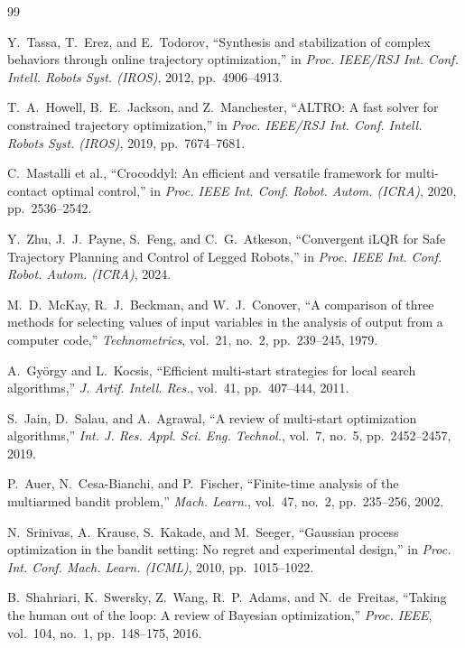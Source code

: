 \documentclass[lettersize,journal]{IEEEtran}
\begin{document}
\begin{thebibliography}{99}


Y.~Tassa, T.~Erez, and E.~Todorov, ``Synthesis and stabilization of complex behaviors through online trajectory optimization,''
in \textit{Proc. IEEE/RSJ Int. Conf. Intell. Robots Syst. (IROS)}, 2012, pp.~4906--4913.

T.~A.~Howell, B.~E.~Jackson, and Z.~Manchester, ``ALTRO: A fast solver for constrained trajectory optimization,''
in \textit{Proc. IEEE/RSJ Int. Conf. Intell. Robots Syst. (IROS)}, 2019, pp.~7674--7681.

C.~Mastalli et al., ``Crocoddyl: An efficient and versatile framework for multi-contact optimal control,''
in \textit{Proc. IEEE Int. Conf. Robot. Autom. (ICRA)}, 2020, pp.~2536--2542.

Y.~Zhu, J.~J.~Payne, S.~Feng, and C.~G.~Atkeson, ``Convergent iLQR for Safe Trajectory Planning and Control of Legged Robots,''
in \textit{Proc. IEEE Int. Conf. Robot. Autom. (ICRA)}, 2024.

M.~D.~McKay, R.~J.~Beckman, and W.~J.~Conover, ``A comparison of three methods for selecting values of input variables in the analysis of output from a computer code,''
\textit{Technometrics}, vol.~21, no.~2, pp.~239--245, 1979.

A.~Gy\"{o}rgy and L.~Kocsis, ``Efficient multi-start strategies for local search algorithms,''
\textit{J. Artif. Intell. Res.}, vol.~41, pp.~407--444, 2011.

S.~Jain, D.~Salau, and A.~Agrawal, ``A review of multi-start optimization algorithms,''
\textit{Int. J. Res. Appl. Sci. Eng. Technol.}, vol.~7, no.~5, pp.~2452--2457, 2019.

P.~Auer, N.~Cesa-Bianchi, and P.~Fischer, ``Finite-time analysis of the multiarmed bandit problem,''
\textit{Mach. Learn.}, vol.~47, no.~2, pp.~235--256, 2002.

N.~Srinivas, A.~Krause, S.~Kakade, and M.~Seeger, ``Gaussian process optimization in the bandit setting: No regret and experimental design,''
in \textit{Proc. Int. Conf. Mach. Learn. (ICML)}, 2010, pp.~1015--1022.

B.~Shahriari, K.~Swersky, Z.~Wang, R.~P.~Adams, and N.~de~Freitas, ``Taking the human out of the loop: A review of Bayesian optimization,''
\textit{Proc. IEEE}, vol.~104, no.~1, pp.~148--175, 2016.


\end{thebibliography}
\end{document}
